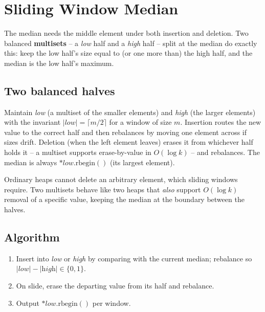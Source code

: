 \section{Sliding Window Median}
\label{sec:cses-sw-median}


\begin{patternbox}
The median needs the middle element under both insertion and deletion. Two
balanced \textbf{multisets} -- a \emph{low} half and a \emph{high} half --
split at the median do exactly this: keep the low half's size equal to (or
one more than) the high half, and the median is the low half's maximum.
\end{patternbox}

\subsection*{Two balanced halves}

Maintain \textit{low} (a multiset of the smaller elements) and \textit{high}
(the larger elements) with the invariant $|\textit{low}|=\lceil m/2\rceil$
for a window of size $m$. Insertion routes the new value to the correct half
and then rebalances by moving one element across if sizes drift. Deletion
(when the left element leaves) erases it from whichever half holds it -- a
multiset supports erase-by-value in $O(\log k)$ -- and rebalances. The
median is always $\ast\textit{low}.\text{rbegin}()$ (its largest element).

\begin{ideabox}
Ordinary heaps cannot delete an arbitrary element, which sliding windows
require. Two multisets behave like two heaps that \emph{also} support
$O(\log k)$ removal of a specific value, keeping the median at the boundary
between the halves.
\end{ideabox}

\subsection*{Algorithm}

\begin{enumerate}
  \item Insert into \textit{low} or \textit{high} by comparing with the
        current median; rebalance so $|\textit{low}|-|\textit{high}|
        \in\{0,1\}$.
  \item On slide, erase the departing value from its half and rebalance.
  \item Output $\ast\textit{low}.\text{rbegin}()$ per window.
\end{enumerate}

